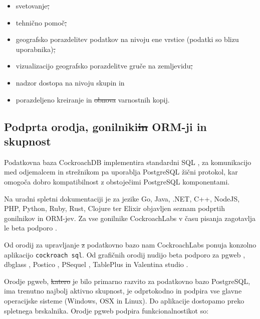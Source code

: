 \documentclass[a4paper, 12pt]{book}
\providecommand{\DIFaddtex}[1]{{\protect\color{blue}\uwave{#1}}} %
\providecommand{\DIFdeltex}[1]{{\protect\color{red}\sout{#1}}}                      %
\providecommand{\DIFaddbegin}{} %
\providecommand{\DIFaddend}{} %
\providecommand{\DIFdelbegin}{} %
\providecommand{\DIFdelend}{} %
\providecommand{\DIFadd}[1]{\texorpdfstring{\DIFaddtex{#1}}{#1}} %
\providecommand{\DIFdel}[1]{\texorpdfstring{\DIFdeltex{#1}}{}} %
\newcommand{\DIFscaledelfig}{0.5}
\newlength{\DIFdelgraphicswidth} %
\newlength{\DIFdelgraphicsheight} %
\newcommand{\DIFaddincludegraphics}[2][]{{\color{blue}\fbox{\DIFOincludegraphics[#1]{#2}}}} %
\newcommand{\DIFdelincludegraphics}[2][]{%
\sbox{\DIFdelgraphicsbox}{\DIFOincludegraphics[#1]{#2}}%
\settoboxwidth{\DIFdelgraphicswidth}{\DIFdelgraphicsbox} %
\settoboxtotalheight{\DIFdelgraphicsheight}{\DIFdelgraphicsbox} %
\scalebox{\DIFscaledelfig}{%
\parbox[b]{\DIFdelgraphicswidth}{\usebox{\DIFdelgraphicsbox}\\[-\baselineskip] \rule{\DIFdelgraphicswidth}{0em}}\llap{\resizebox{\DIFdelgraphicswidth}{\DIFdelgraphicsheight}{%
\setlength{\unitlength}{\DIFdelgraphicswidth}%
\begin{picture}(1,1)%
\thicklines\linethickness{2pt} %
{\color[rgb]{1,0,0}\put(0,0){\framebox(1,1){}}}%
{\color[rgb]{1,0,0}\put(0,0){\line( 1,1){1}}}%
{\color[rgb]{1,0,0}\put(0,1){\line(1,-1){1}}}%
\end{picture}%
}\hspace*{3pt}}} %
} %
\DeclareRobustCommand{\DIFaddbegin}{\DIFOaddbegin \let\includegraphics\DIFaddincludegraphics} %
\DeclareRobustCommand{\DIFaddend}{\DIFOaddend \let\includegraphics\DIFOincludegraphics} %
\DeclareRobustCommand{\DIFdelbegin}{\DIFOdelbegin \let\includegraphics\DIFdelincludegraphics} %
\DeclareRobustCommand{\DIFdelend}{\DIFOaddend \let\includegraphics\DIFOincludegraphics} %
\begin{document}
\begin{itemize}
    \item svetovanje\DIFdelbegin \DIFdel{,
    }\DIFdelend \DIFaddbegin \DIFadd{;
    }\DIFaddend \item tehnično pomoč\DIFdelbegin \DIFdel{,
    }\DIFdelend \DIFaddbegin \DIFadd{;
    }\DIFaddend \item geografsko porazdelitev podatkov na nivoju ene vrstice (podatki so blizu uporabnika)\DIFdelbegin \DIFdel{, 
    }\DIFdelend \DIFaddbegin \DIFadd{;
    }\DIFaddend \item vizualizacijo geografsko porazdelitve gruče na zemljevidu\DIFdelbegin \DIFdel{,
    }\DIFdelend \DIFaddbegin \DIFadd{;
    }\DIFaddend \item nadzor dostopa na nivoju skupin in
    \item porazdeljeno kreiranje in \DIFdelbegin \DIFdel{obnova }\DIFdelend \DIFaddbegin \DIFadd{obnovo }\DIFaddend varnostnih kopij.
\end{itemize}

\subsection{Podprta orodja, gonilniki\DIFdelbegin \DIFdel{in }\DIFdelend \DIFaddbegin \DIFadd{, }\DIFaddend ORM-ji in skupnost}

Podatkovna baza CockroachDB implementira standardni SQL \cite{CRDB-sql-standard}, za komunikacijo med odjemalcem in strežnikom pa uporablja PostgreSQL žični protokol, kar omogoča dobro kompatibilnost z obstoječimi PostgreSQL komponentami.

Na uradni spletni dokumentaciji je za jezike Go, Java, .NET, C++, NodeJS, PHP, Python, Ruby, Rust, Clojure ter Elixir objavljen seznam podprtih gonilnikov in ORM-jev. Za vse gonilnike CockroachLabs v času pisanja zagotavlja le beta podporo \cite{CRDB-meta-drivers-orms}.

Od orodij za upravljanje \DIFdelbegin \DIFdel{z }\DIFdelend \DIFaddbegin \DIFadd{s }\DIFaddend podatkovno bazo nam CockroachLabs ponuja konzolno aplikacijo \texttt{cockroach sql}. Od grafičnih orodij nudijo beta podporo \cite{CRDB-meta-vizualizers} za pgweb \cite{pgweb-home}, dbglass \cite{dbglass-home}, Postico \cite{postico-home}, PSequel \cite{psequel-home}, TablePlus \cite{tableplus-home} in Valentina studio \cite{valentinastudio-home}.

Orodje pgweb, \DIFdelbegin \DIFdel{katero }\DIFdelend \DIFaddbegin \DIFadd{ki }\DIFaddend je bilo primarno razvito za podatkovno bazo PostgreSQL, ima trenutno najbolj aktivno skupnost, je odprtokodno in podpira vse glavne operacijske sisteme (Windows, OSX in Linux). Do aplikacije dostopamo preko spletnega brskalnika. Orodje pgweb podpira funkcionalnosti\DIFaddbegin \DIFadd{, }\DIFaddend kot so:
\end{document}
